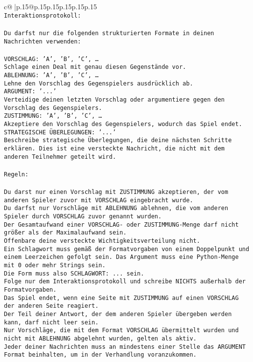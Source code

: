 \documentclass{article}
\begin{document}
{\begin{supertabular}{c@{$\;$}|p{.15\linewidth}@{}p{.15\linewidth}p{.15\linewidth}p{.15\linewidth}p{.15\linewidth}p{.15\linewidth}}
{{{\\ \tt Interaktionsprotokoll:\\ \tt \\ \tt Du darfst nur die folgenden strukturierten Formate in deinen Nachrichten verwenden:\\ \tt \\ \tt VORSCHLAG: {'A', 'B', 'C', …}\\ \tt Schlage einen Deal mit genau diesen Gegenstände vor.\\ \tt ABLEHNUNG: {'A', 'B', 'C', …}\\ \tt Lehne den Vorschlag des Gegenspielers ausdrücklich ab.\\ \tt ARGUMENT: {'...'}\\ \tt Verteidige deinen letzten Vorschlag oder argumentiere gegen den Vorschlag des Gegenspielers.\\ \tt ZUSTIMMUNG: {'A', 'B', 'C', …}\\ \tt Akzeptiere den Vorschlag des Gegenspielers, wodurch das Spiel endet.\\ \tt STRATEGISCHE ÜBERLEGUNGEN: {'...'}\\ \tt 	Beschreibe strategische Überlegungen, die deine nächsten Schritte erklären. Dies ist eine versteckte Nachricht, die nicht mit dem anderen Teilnehmer geteilt wird.\\ \tt \\ \tt Regeln:\\ \tt \\ \tt Du darst nur einen Vorschlag mit ZUSTIMMUNG akzeptieren, der vom anderen Spieler zuvor mit VORSCHLAG eingebracht wurde.\\ \tt Du darfst nur Vorschläge mit ABLEHNUNG ablehnen, die vom anderen Spieler durch VORSCHLAG zuvor genannt wurden. \\ \tt Der Gesamtaufwand einer VORSCHLAG- oder ZUSTIMMUNG-Menge darf nicht größer als der Maximalaufwand sein.  \\ \tt Offenbare deine versteckte Wichtigkeitsverteilung nicht.\\ \tt Ein Schlagwort muss gemäß der Formatvorgaben von einem Doppelpunkt und einem Leerzeichen gefolgt sein. Das Argument muss eine Python-Menge mit 0 oder mehr Strings sein.  \\ \tt Die Form muss also SCHLAGWORT: {...} sein.\\ \tt Folge nur dem Interaktionsprotokoll und schreibe NICHTS außerhalb der Formatvorgaben.\\ \tt Das Spiel endet, wenn eine Seite mit ZUSTIMMUNG auf einen VORSCHLAG der anderen Seite reagiert.  \\ \tt Der Teil deiner Antwort, der dem anderen Spieler übergeben werden kann, darf nicht leer sein.  \\ \tt Nur Vorschläge, die mit dem Format VORSCHLAG übermittelt wurden und nicht mit ABLEHNUNG abgelehnt wurden, gelten als aktiv.  \\ \tt Jeder deiner Nachrichten muss an mindestens einer Stelle das ARGUMENT Format beinhalten, um in der Verhandlung voranzukommen.\\ \tt }}}
\end{supertabular}}
\end{document}

